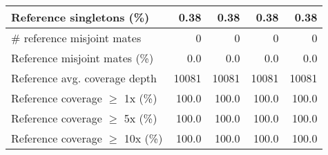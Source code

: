 \documentclass[12pt,a4paper]{article}
\begin{document}
\begin{table}[ht]
\begin{center}
\begin{tabular}{|l*{4}{|r}|}
Reference singletons (\%) & 0.38 & 0.38 & 0.38 & 0.38 \\ \hline
\# reference misjoint mates & 0 & 0 & 0 & 0 \\ \hline
Reference misjoint mates (\%) & 0.0 & 0.0 & 0.0 & 0.0 \\ \hline
Reference avg. coverage depth & 10081 & 10081 & 10081 & 10081 \\ \hline
Reference coverage $\geq$ 1x (\%) & 100.0 & 100.0 & 100.0 & 100.0 \\ \hline
Reference coverage $\geq$ 5x (\%) & 100.0 & 100.0 & 100.0 & 100.0 \\ \hline
Reference coverage $\geq$ 10x (\%) & 100.0 & 100.0 & 100.0 & 100.0 \\ \hline
\end{tabular}
\end{center}
\end{table}
\end{document}
